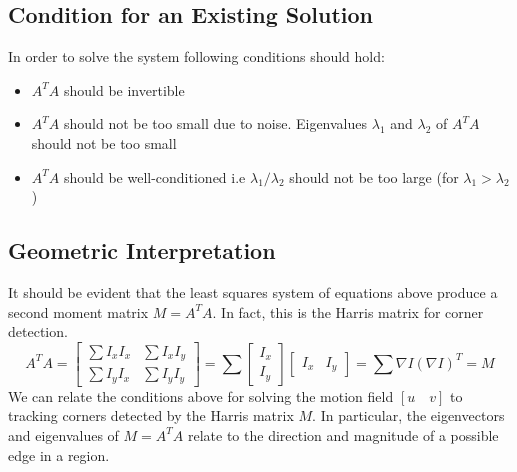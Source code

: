 \documentclass{article}
\begin{document}
\subsection{Condition for an Existing Solution}
In order to solve the system following conditions should hold:
\begin{itemize}
\item $A^TA$ should be invertible 
\item $A^TA$ should not be too small due to noise.
\subitem Eigenvalues $\lambda_1$ and $\lambda_2$ of $A^TA$ should not be too small 
\item $A^TA$ should be well-conditioned
\subitem i.e $\lambda_1 / \lambda_2$ should not be too large (for $\lambda_1 > \lambda_2$ )
\end{itemize}

\subsection{Geometric Interpretation}
It should be evident that the least squares system of equations above produce a second moment matrix $M = A^TA$. In fact, this is the Harris matrix for corner detection. 
\[ 
A^TA = 
\begin{bmatrix}
	\sum I_xI_x & \sum I_xI_y \\
    \sum I_yI_x & \sum I_yI_y
\end{bmatrix} = \sum
\begin{bmatrix} I_x \\ I_y \end{bmatrix} \begin{bmatrix} I_x & I_y \end{bmatrix} = \sum \nabla I ( \nabla I ) ^T = M
\]
We can relate the conditions above for solving the motion field $[u \quad v]$ to tracking corners detected by the Harris matrix $M$.  In particular, the eigenvectors and eigenvalues of $M=A^TA$ relate to the direction and magnitude of a possible edge in a region.  
\end{document}

